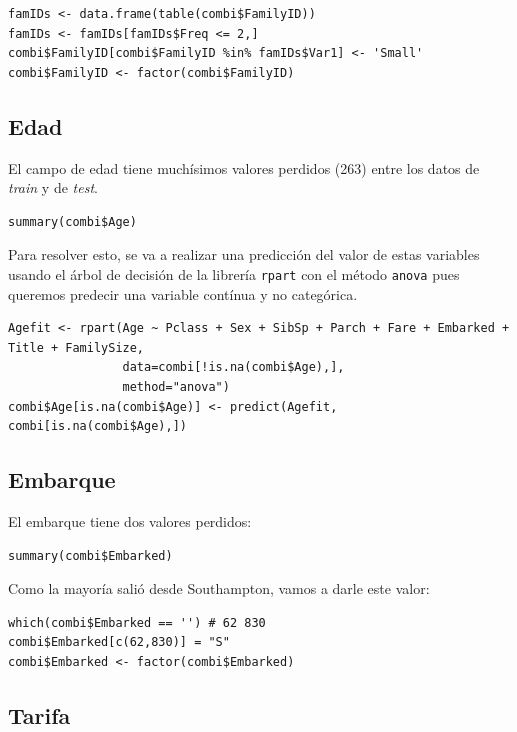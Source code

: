 \begin{lstlisting}[style=R]
famIDs <- data.frame(table(combi$FamilyID))
famIDs <- famIDs[famIDs$Freq <= 2,]
combi$FamilyID[combi$FamilyID %in% famIDs$Var1] <- 'Small'
combi$FamilyID <- factor(combi$FamilyID)
\end{lstlisting}

\subsection{Edad}

El campo de edad tiene muchísimos valores perdidos (263) entre los datos de \textit{train} y de \textit{test}.

\begin{lstlisting}[style=R]
summary(combi$Age)
\end{lstlisting}

Para resolver esto, se va a realizar una predicción del valor de estas variables usando el árbol de decisión de la librería \texttt{rpart} con el método \texttt{anova} pues queremos predecir una variable contínua y no categórica.

\begin{lstlisting}[style=R]
Agefit <- rpart(Age ~ Pclass + Sex + SibSp + Parch + Fare + Embarked + Title + FamilySize,
                data=combi[!is.na(combi$Age),], 
                method="anova")
combi$Age[is.na(combi$Age)] <- predict(Agefit, combi[is.na(combi$Age),])
\end{lstlisting}

\subsection{Embarque}

El embarque tiene dos valores perdidos:

\begin{lstlisting}[style=R]
summary(combi$Embarked)
\end{lstlisting}

Como la mayoría salió desde Southampton, vamos a darle este valor:

\begin{lstlisting}[style=R]
which(combi$Embarked == '') # 62 830
combi$Embarked[c(62,830)] = "S"
combi$Embarked <- factor(combi$Embarked)
\end{lstlisting}

\subsection{Tarifa}

